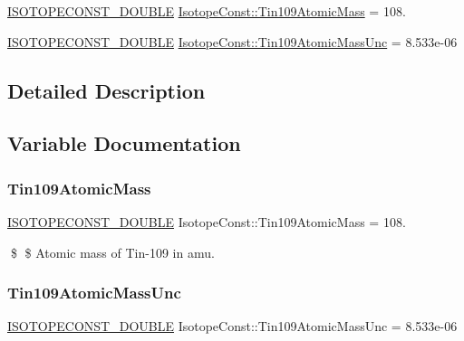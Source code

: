 \begin{DoxyCompactItemize}
\item 
\mbox{\hyperlink{group___isotope_const-_macros_ga8f45a7272ce02c0b4c65c44636ed719a}{I\+S\+O\+T\+O\+P\+E\+C\+O\+N\+S\+T\+\_\+\+D\+O\+U\+B\+LE}} \mbox{\hyperlink{group___isotope_const-_tin-_sn109_gaf687728cd3dfd7522d803406e173415b}{Isotope\+Const\+::\+Tin109\+Atomic\+Mass}} = 108.
\item 
\mbox{\hyperlink{group___isotope_const-_macros_ga8f45a7272ce02c0b4c65c44636ed719a}{I\+S\+O\+T\+O\+P\+E\+C\+O\+N\+S\+T\+\_\+\+D\+O\+U\+B\+LE}} \mbox{\hyperlink{group___isotope_const-_tin-_sn109_gaa41c32750e502578599cddf1373ad0b2}{Isotope\+Const\+::\+Tin109\+Atomic\+Mass\+Unc}} = 8.\+533e-\/06
\end{DoxyCompactItemize}


\subsection{Detailed Description}


\subsection{Variable Documentation}
\mbox{\label{group___isotope_const-_tin-_sn109_gaf687728cd3dfd7522d803406e173415b}} 
\subsubsection{\texorpdfstring{Tin109\+Atomic\+Mass}{Tin109AtomicMass}}
{\footnotesize\ttfamily \mbox{\hyperlink{group___isotope_const-_macros_ga8f45a7272ce02c0b4c65c44636ed719a}{I\+S\+O\+T\+O\+P\+E\+C\+O\+N\+S\+T\+\_\+\+D\+O\+U\+B\+LE}} Isotope\+Const\+::\+Tin109\+Atomic\+Mass = 108.}

\$ \$ Atomic mass of Tin-\/109 in amu. \mbox{\label{group___isotope_const-_tin-_sn109_gaa41c32750e502578599cddf1373ad0b2}} 
\subsubsection{\texorpdfstring{Tin109\+Atomic\+Mass\+Unc}{Tin109AtomicMassUnc}}
{\footnotesize\ttfamily \mbox{\hyperlink{group___isotope_const-_macros_ga8f45a7272ce02c0b4c65c44636ed719a}{I\+S\+O\+T\+O\+P\+E\+C\+O\+N\+S\+T\+\_\+\+D\+O\+U\+B\+LE}} Isotope\+Const\+::\+Tin109\+Atomic\+Mass\+Unc = 8.\+533e-\/06}

